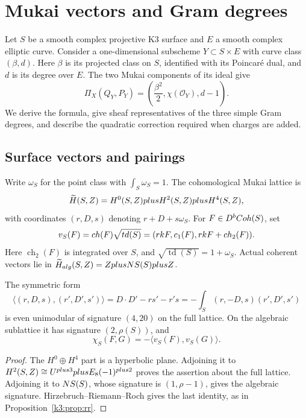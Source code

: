 \section{Mukai vectors and Gram degrees}
\label{appendix:mukai-gram-dictionary}

Let $S$ be a smooth complex projective K3 surface and $E$ a smooth
complex elliptic curve.  Consider a one-dimensional subscheme $Y\subset S\times E$ with
curve class $(\beta,d)$.  Here $\beta$ is its projected class on $S$,
identified with its Poincar\'e dual, and $d$ is its degree over $E$.  The two Mukai components of its ideal give
\[
\Pi_X(Q_Y,P_Y)=\left(\frac{\beta^2}{2},\chi(\mathcal O_Y),d-1\right).
\]
We derive the formula, give sheaf representatives of the three
simple Gram degrees, and describe the quadratic correction required
when charges are added.

\subsection{Surface vectors and pairings}
\label{subsec:mukai-vector-pairing}

\begin{definition}
\label{def:mukai-lattice-vector-appendixC}
Write $\omega_S$ for the point class with $\int_S\omega_S=1$.
The cohomological Mukai lattice is
\[
\widetilde H(S,Z)=H^0(S,Z)plus H^2(S,Z)plus H^4(S,Z),
\]
with coordinates $(r,D,s)$ denoting $r+D+s\omega_S$.
For $F\in D^bCoh(S)$, set
\[
v_S(F)=ch(F)\sqrt{td(S)}
=(rk F,c_1(F),rk F+ch_2(F)).
\]
Here $\operatorname{ch}_2(F)$ is integrated over $S$, and
$\sqrt{\operatorname{td}(S)}=1+\omega_S$.  Actual coherent vectors
lie in $\widetilde H_{alg}(S,Z)=ZplusNS(S)plusZ$.
\end{definition}

\begin{proposition}
\label{prop:mukai-pairing-appendixC}
The symmetric form
\[
\langle(r,D,s),(r',D',s')\rangle=D\cdot D'-rs'-r's
=-\int_S(r,-D,s)(r',D',s')
\]
is even unimodular of signature $(4,20)$ on the full lattice.
On the algebraic sublattice it has signature $(2,\rho(S))$, and
\[
\chi_S(F,G)=-\langle v_S(F),v_S(G)\rangle.
\]
\end{proposition}

\begin{proof}
The $H^0\oplus H^4$ part is a hyperbolic plane.  Adjoining it to
$H^2(S,Z)\cong U^{plus3}plus E_8(-1)^{plus2}$ proves
the assertion about the full lattice.  Adjoining it to $NS(S)$,
whose signature is $(1,\rho-1)$, gives the algebraic signature.
Hirzebruch--Riemann--Roch gives the last identity, as in
Proposition~\ref{k3:prop:rr}.
\end{proof}

